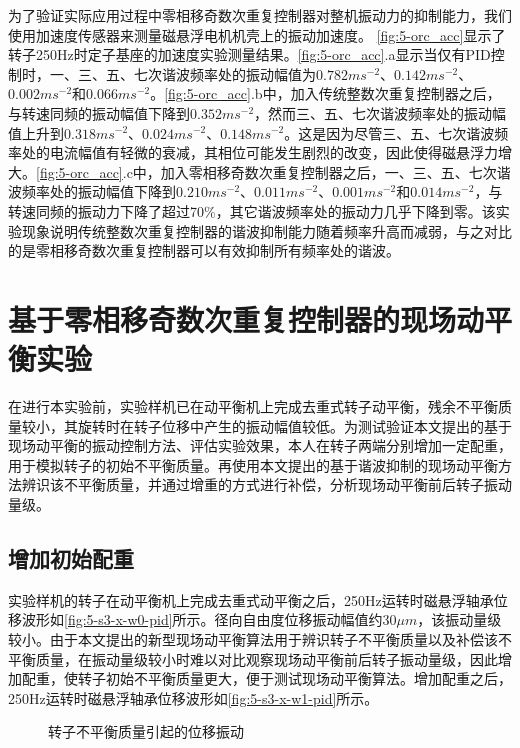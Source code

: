 为了验证实际应用过程中零相移奇数次重复控制器对整机振动力的抑制能力，我们使用加速度传感器来测量磁悬浮电机机壳上的振动加速度。
\autoref{fig:5-orc_acc}显示了转子250Hz时定子基座的加速度实验测量结果。\autoref{fig:5-orc_acc}.a显示当仅有PID控制时，一、三、五、七次谐波频率处的振动幅值为$0.782ms^{-2}$、$0.142ms^{-2}$、$0.002ms^{-2}$和$0.066ms^{-2}$。\autoref{fig:5-orc_acc}.b中，加入传统整数次重复控制器之后，与转速同频的振动幅值下降到$0.352ms^{-2}$，然而三、五、七次谐波频率处的振动幅值上升到$0.318ms^{-2}$、$0.024ms^{-2}$、$0.148ms^{-2}$。这是因为尽管三、五、七次谐波频率处的电流幅值有轻微的衰减，其相位可能发生剧烈的改变，因此使得磁悬浮力增大。\autoref{fig:5-orc_acc}.c中，加入零相移奇数次重复控制器之后，一、三、五、七次谐波频率处的振动幅值下降到$0.210ms^{-2}$、$0.011ms^{-2}$、$0.001ms^{-2}$和$0.014ms^{-2}$，与转速同频的振动力下降了超过70\%，其它谐波频率处的振动力几乎下降到零。该实验现象说明传统整数次重复控制器的谐波抑制能力随着频率升高而减弱，与之对比的是零相移奇数次重复控制器可以有效抑制所有频率处的谐波。

\section{基于零相移奇数次重复控制器的现场动平衡实验}
在进行本实验前，实验样机已在动平衡机上完成去重式转子动平衡，残余不平衡质量较小，其旋转时在转子位移中产生的振动幅值较低。为测试验证本文提出的基于现场动平衡的振动控制方法、评估实验效果，本人在转子两端分别增加一定配重，用于模拟转子的初始不平衡质量。再使用本文提出的基于谐波抑制的现场动平衡方法辨识该不平衡质量，并通过增重的方式进行补偿，分析现场动平衡前后转子振动量级。

\subsection{增加初始配重}

实验样机的转子在动平衡机上完成去重式动平衡之后，250Hz运转时磁悬浮轴承位移波形如\autoref{fig:5-s3-x-w0-pid}所示。径向自由度位移振动幅值约$30\mu m$，该振动量级较小。由于本文提出的新型现场动平衡算法用于辨识转子不平衡质量以及补偿该不平衡质量，在振动量级较小时难以对比观察现场动平衡前后转子振动量级，因此增加配重，使转子初始不平衡质量更大，便于测试现场动平衡算法。增加配重之后，250Hz运转时磁悬浮轴承位移波形如\autoref{fig:5-s3-x-w1-pid}所示。

\begin{figure}[htb]  
	\quad  
	  		\caption{转子不平衡质量引起的位移振动}  \label{fig:5-s3-x-w0/w1}\end{figure}

